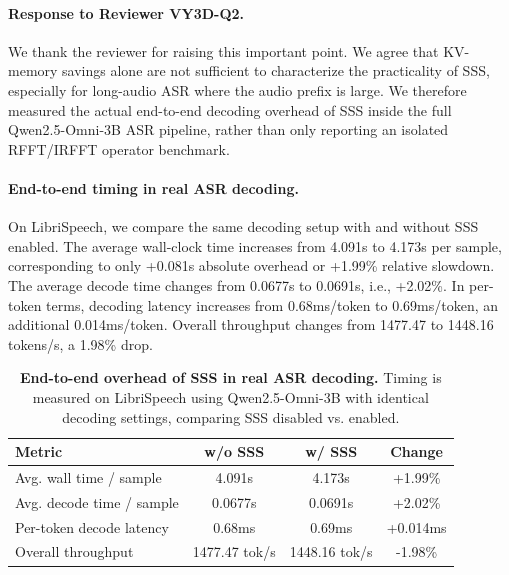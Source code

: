 \begin{answer}

    \paragraph{Response to Reviewer VY3D-Q2.}
    We thank the reviewer for raising this important point.
    We agree that KV-memory savings alone are not sufficient to characterize the practicality of SSS, especially for long-audio ASR where the audio prefix is large.
    We therefore measured the actual end-to-end decoding overhead of SSS inside the full Qwen2.5-Omni-3B ASR pipeline, rather than only reporting an isolated RFFT/IRFFT operator benchmark.

    \paragraph{End-to-end timing in real ASR decoding.}
    On LibriSpeech, we compare the same decoding setup with and without SSS enabled.
    The average wall-clock time increases from 4.091s to 4.173s per sample, corresponding to only +0.081s absolute overhead or +1.99\% relative slowdown.
    The average decode time changes from 0.0677s to 0.0691s, i.e., +2.02\%.
    In per-token terms, decoding latency increases from 0.68ms/token to 0.69ms/token, an additional 0.014ms/token.
    Overall throughput changes from 1477.47 to 1448.16 tokens/s, a 1.98\% drop.

    \begin{table}[t]
    \centering
    \small
    \setlength{\tabcolsep}{4pt}
    \caption{\textbf{End-to-end overhead of SSS in real ASR decoding.} Timing is measured on LibriSpeech using Qwen2.5-Omni-3B with identical decoding settings, comparing SSS disabled vs. enabled.}
    \label{tab:rebuttal-sss-e2e-overhead}
    \begin{tabular}{lccc}
    \toprule
    \textbf{Metric} & \textbf{w/o SSS} & \textbf{w/ SSS} & \textbf{Change} \\
    \midrule
    Avg. wall time / sample & 4.091s & 4.173s & +1.99\% \\
    Avg. decode time / sample & 0.0677s & 0.0691s & +2.02\% \\
    Per-token decode latency & 0.68ms & 0.69ms & +0.014ms \\
    Overall throughput & 1477.47 tok/s & 1448.16 tok/s & -1.98\% \\
    \bottomrule
    \end{tabular}
    \end{table}


\end{answer}
